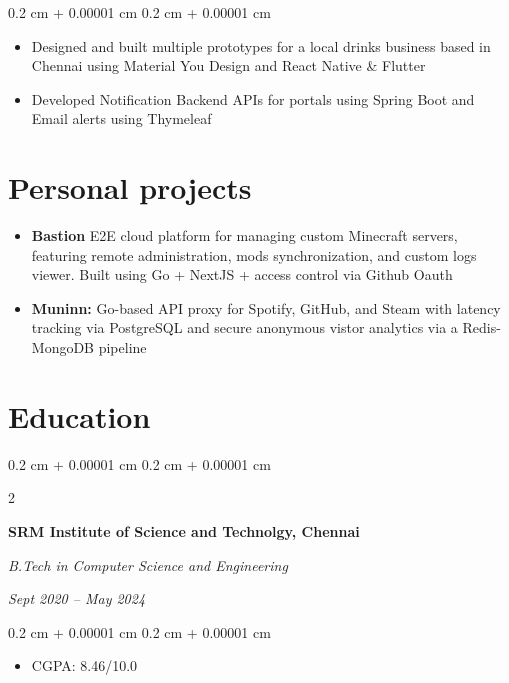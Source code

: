 \documentclass[10pt, letterpaper]{article}
\newenvironment{highlights}{
    \begin{itemize}[
        topsep=0.10 cm,
        parsep=0.10 cm,
        partopsep=0pt,
        itemsep=0pt,
        leftmargin=0.1 cm + 10pt
    ]
}{
    \end{itemize}
} %
\newenvironment{onecolentry}{
    \begin{adjustwidth}{
        0.2 cm + 0.00001 cm
    }{
        0.2 cm + 0.00001 cm
    }
}{
    \end{adjustwidth}
} %
\newenvironment{twocolentry}[2][]{
    \onecolentry
    \def\secondColumn{#2}
    \setcolumnwidth{\fill, 4.5 cm}
    \begin{paracol}{2}
}{
    \switchcolumn\raggedleft\secondColumn
    \end{paracol}
    \endonecolentry
} %
\let\hrefWithoutArrow\href
\renewcommand{\href}[2]{\hrefWithoutArrow{#1}{\ifthenelse{\equal{#2}{}}{ }{#2 }\raisebox{.15ex}{\footnotesize \faExternalLink*}}}
\begin{document}
\vspace{0.10 cm}
\begin{onecolentry}
    \begin{highlights}
        \item Designed and built multiple prototypes for a local drinks business
        based in Chennai using Material You Design and React Native \& Flutter
        \item Developed Notification Backend APIs for
        \textit{\href{https://chateleon.com}{Chateleon}} portals using Spring Boot and
        Email alerts using Thymeleaf
    \end{highlights}
\end{onecolentry}

\section{Personal projects}
\begin{itemize}
    \item \textbf{Bastion} E2E cloud platform for managing custom Minecraft servers, featuring remote administration, mods synchronization, and custom logs viewer. Built using Go + NextJS + access control via Github Oauth \href{https://bastion.arhm.dev}{\textit{[Visit]}}
    \item \textbf{Muninn:} Go-based API proxy for Spotify, GitHub, and Steam with latency tracking via PostgreSQL and secure anonymous vistor analytics via a Redis-MongoDB pipeline \href{https://muninn.arhm.dev}{\textit{[Visit]}}
\end{itemize}


\section{Education}

\begin{twocolentry}{

        \textit{Sept 2020 – May 2024}}
    \textbf{SRM Institute of Science and Technolgy, Chennai}

    \textit{B.Tech in Computer Science and Engineering}
\end{twocolentry}

\vspace{0.10 cm}
\begin{onecolentry}
    \begin{highlights}
        \item CGPA: 8.46/10.0
    \end{highlights}
\end{onecolentry}

\vspace{0.2 cm}
\end{document}
